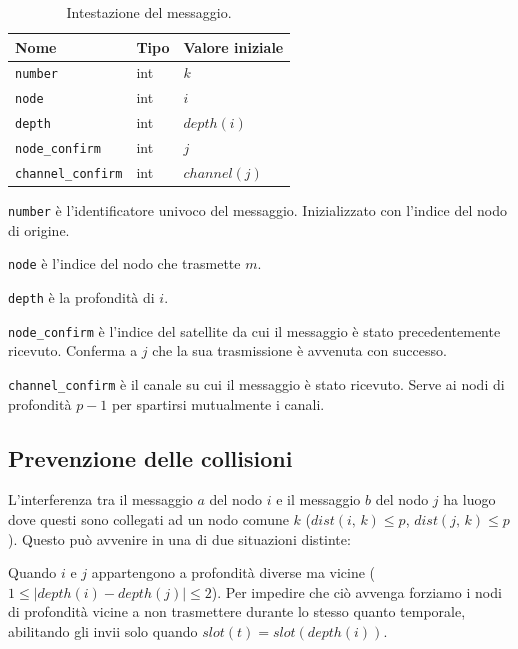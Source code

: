 \documentclass[a4paper,11pt]{article}
\theoremstyle{definition}
\begin{document}
\begin{table}[H]
\centering
\begin{tabular}{| l | l | l |}
\multicolumn{1}{l}{Nome} &
\multicolumn{1}{l}{Tipo} &
\multicolumn{1}{l}{Valore iniziale} \\ \hline
\texttt{number} & int & $k$ \\ \hline
\texttt{node} & int & $i$ \\ \hline
\texttt{depth} & int & $depth(i)$ \\ \hline
\texttt{node\_confirm} & int & $j$ \\ \hline
\texttt{channel\_confirm} & int & $channel(j)$ \\ \hline
\end{tabular}
\caption{Intestazione del messaggio.}
\end{table}

\texttt{number} è l'identificatore univoco del messaggio. Inizializzato con l'indice del nodo di origine.

\texttt{node} è l'indice del nodo che trasmette $m$.

\texttt{depth} è la profondità di $i$.

\texttt{node\_confirm} è l'indice del satellite da cui il messaggio è stato precedentemente ricevuto. Conferma a $j$ che la sua trasmissione è avvenuta con successo.

\texttt{channel\_confirm} è il canale su cui il messaggio è stato ricevuto. Serve ai nodi di profondità $p-1$ per spartirsi mutualmente i canali.

\subsection{Prevenzione delle collisioni}

L'interferenza tra il messaggio $a$ del nodo $i$ e il messaggio $b$ del nodo $j$ ha luogo dove questi sono collegati ad un nodo comune $k$ ($dist(i,\,k) \leq p$, $dist(j,\,k) \leq p$). Questo può avvenire in una di due situazioni distinte:

Quando $i$ e $j$ appartengono a profondità diverse ma vicine ($1 \leq |depth(i) - depth(j)| \leq 2$). Per impedire che ciò avvenga forziamo i nodi di profondità vicine a non trasmettere durante lo stesso quanto temporale, abilitando gli invii solo quando $slot(t) = slot(depth(i))$.
\end{document}
